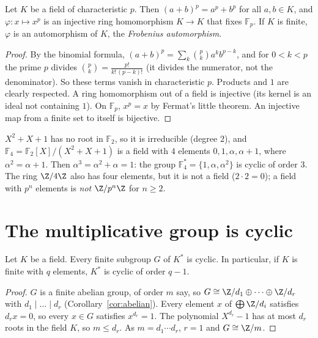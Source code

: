 \begin{lemma}[Frobenius]\label{lem:frob}
Let $K$ be a field of characteristic $p$. Then $(a+b)^p=a^p+b^p$ for all $a,b\in K$, and $\varphi:x\mapsto x^p$ is an injective ring homomorphism $K\to K$ that fixes $\mathbb F_p$. If $K$ is finite, $\varphi$ is an automorphism of $K$, the \emph{Frobenius automorphism}.
\end{lemma}
\begin{proof}
By the binomial formula, $(a+b)^p=\sum_k\binom pka^kb^{p-k}$, and for $0<k<p$ the prime $p$ divides $\binom pk=\frac{p!}{k!\,(p-k)!}$ (it divides the numerator, not the denominator). So these terms vanish in characteristic $p$. Products and $1$ are clearly respected. A ring homomorphism out of a field is injective (its kernel is an ideal not containing $1$). On $\mathbb F_p$, $x^p=x$ by Fermat's little theorem. An injective map from a finite set to itself is bijective.
\end{proof}

\begin{example}\label{ex:f4}
$X^2+X+1$ has no root in $\mathbb F_2$, so it is irreducible (degree $2$), and $\mathbb F_4=\mathbb F_2[X]/(X^2+X+1)$ is a field with $4$ elements $0,1,\alpha,\alpha+1$, where $\alpha^2=\alpha+1$. Then $\alpha^3=\alpha^2+\alpha=1$: the group $\mathbb F_4^*=\{1,\alpha,\alpha^2\}$ is cyclic of order $3$. The ring $\Z/4\Z$ also has four elements, but it is not a field ($2\cdot2=0$); a field with $p^n$ elements is \emph{not} $\Z/p^n\Z$ for $n\ge2$.
\end{example}

\section{The multiplicative group is cyclic}

\begin{theorem}\label{thm:cyclicmult}
Let $K$ be a field. Every finite subgroup $G$ of $K^*$ is cyclic. In particular, if $K$ is finite with $q$ elements, $K^*$ is cyclic of order $q-1$.
\end{theorem}
\begin{proof}
$G$ is a finite abelian group, of order $m$ say, so $G\cong\Z/d_1\oplus\dots\oplus\Z/d_r$ with $d_1\mid\dots\mid d_r$ (Corollary~\ref{cor:abelian}). Every element $x$ of $\bigoplus\Z/d_i$ satisfies $d_rx=0$, so every $x\in G$ satisfies $x^{d_r}=1$. The polynomial $X^{d_r}-1$ has at most $d_r$ roots in the field $K$, so $m\le d_r$. As $m=d_1\cdots d_r$, $r=1$ and $G\cong\Z/m$.
\end{proof}

